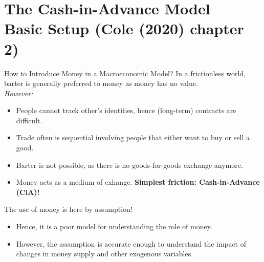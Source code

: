 \documentclass[10pt,c,aspectratio=1610,handout]{beamer}
\begin{document}
\section{The Cash-in-Advance Model\\\small{Basic Setup (Cole (2020) chapter 2)}}
\begin{frame}{How to Introduce Money in a Macroeconomic Model?}%
  In a frictionless world, barter is generally preferred to money as money has no value.\\%
  \medskip%
  \emph{However:}%
  \pause%
  \begin{itemize}%
    \item[$\blacktriangleright$] People cannot track other's identities, hence (long-term) contracts are difficult.%
    \item[$\blacktriangleright$] Trade often is sequential involving people that either want to buy or sell a good.%
    \item[$\Rightarrow$] Barter is not possible, as there is no goods-for-goods exchange anymore.%
    \item[$\Rightarrow$] Money acts as a medium of exhange. \textbf{Simplest friction: Cash-in-Advance (CiA)!}%
  \end{itemize}%
  \vspace*{0.2in}%
  \pause%
  The use of money is here by assumption!%
  \begin{itemize}%
    \item[$\blacktriangleright$] Hence, it is a poor model for understanding the role of money.%
    \item[$\blacktriangleright$] However, the assumption is accurate enough to understand the impact of changes in money supply and other exogenous variables.%
  \end{itemize}%
\end{frame}%
\end{document}
